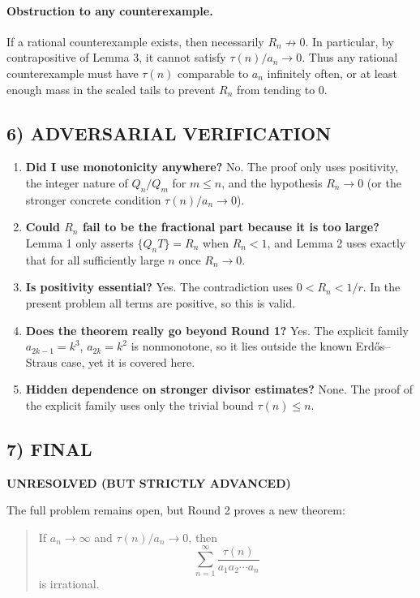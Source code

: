 \paragraph{Obstruction to any counterexample.}
If a rational counterexample exists, then necessarily $R_n\not\to 0$. In particular, by contrapositive of Lemma 3, it cannot satisfy $\tau(n)/a_n\to 0$. Thus any rational counterexample must have $\tau(n)$ comparable to $a_n$ infinitely often, or at least enough mass in the scaled tails to prevent $R_n$ from tending to $0$.

\subsection*{6) ADVERSARIAL VERIFICATION}
\begin{enumerate}
\item \textbf{Did I use monotonicity anywhere?} No. The proof only uses positivity, the integer nature of $Q_n/Q_m$ for $m\le n$, and the hypothesis $R_n\to 0$ (or the stronger concrete condition $\tau(n)/a_n\to 0$).
\item \textbf{Could $R_n$ fail to be the fractional part because it is too large?} Lemma 1 only asserts $\{Q_nT\}=R_n$ when $R_n<1$, and Lemma 2 uses exactly that for all sufficiently large $n$ once $R_n\to 0$.
\item \textbf{Is positivity essential?} Yes. The contradiction uses $0<R_n<1/r$. In the present problem all terms are positive, so this is valid.
\item \textbf{Does the theorem really go beyond Round 1?} Yes. The explicit family $a_{2k-1}=k^3$, $a_{2k}=k^2$ is nonmonotone, so it lies outside the known Erd\H{o}s--Straus case, yet it is covered here.
\item \textbf{Hidden dependence on stronger divisor estimates?} None. The proof of the explicit family uses only the trivial bound $\tau(n)\le n$.
\end{enumerate}

\subsection*{7) FINAL}
\textbf{UNRESOLVED (BUT STRICTLY ADVANCED)}

The full problem remains open, but Round 2 proves a new theorem:

\begin{quote}
If $a_n\to\infty$ and $\tau(n)/a_n\to 0$, then
\[
\sum_{n=1}^{\infty}\frac{\tau(n)}{a_1a_2\cdots a_n}
\]
is irrational.
\end{quote}

